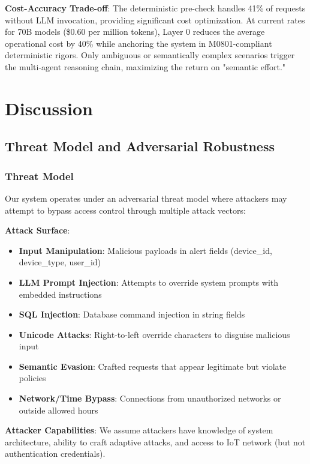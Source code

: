\documentclass[conference]{IEEEtran}
\begin{document}
\textbf{Cost-Accuracy Trade-off}: The deterministic pre-check handles 41\% of requests without LLM invocation, providing significant cost optimization. At current rates for 70B models (\$0.60 per million tokens), Layer 0 reduces the average operational cost by 40\% while anchoring the system in M0801-compliant deterministic rigors. Only ambiguous or semantically complex scenarios trigger the multi-agent reasoning chain, maximizing the return on "semantic effort."

\section{Discussion}

\subsection{Threat Model and Adversarial Robustness}

\subsubsection{Threat Model}

Our system operates under an adversarial threat model where attackers may attempt to bypass access control through multiple attack vectors:

\textbf{Attack Surface}:
\begin{itemize}
    \item \textbf{Input Manipulation}: Malicious payloads in alert fields (device\_id, device\_type, user\_id)
    \item \textbf{LLM Prompt Injection}: Attempts to override system prompts with embedded instructions
    \item \textbf{SQL Injection}: Database command injection in string fields
    \item \textbf{Unicode Attacks}: Right-to-left override characters to disguise malicious input
    \item \textbf{Semantic Evasion}: Crafted requests that appear legitimate but violate policies
    \item \textbf{Network/Time Bypass}: Connections from unauthorized networks or outside allowed hours
\end{itemize}

\textbf{Attacker Capabilities}: We assume attackers have knowledge of system architecture, ability to craft adaptive attacks, and access to IoT network (but not authentication credentials).
\end{document}
